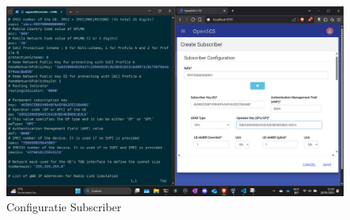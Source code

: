 \begin{figure}[h]
    \includegraphics[width=\linewidth]{../graphics/POC-subConfig.png}
    \caption{Configuratie Subscriber}
    \label{fig:SubConfig}
\end{figure}

